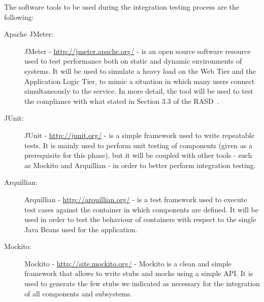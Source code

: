 The software tools to be used during the integration testing process are the following:

\begin{description}
\item[Apache JMeter:] JMeter - \url{http://jmeter.apache.org/} - is an open source software resource used to test performance both on static and dynamic environments of systems. It will be used to simulate a heavy load on the Web Tier and the Application Logic Tier, to mimic a situation in which many users connect simultaneously to the service. In more detail, the tool will be used to test the compliance with what stated in Section 3.3 of the RASD~\cite{rasd}.
\item[JUnit:] JUnit - \url{http://junit.org/} - is a simple framework used to write repeatable tests. It is mainly used to perform unit testing of components (given as a prerequisite for this phase), but it will be coupled with other tools - such as Mockito and Arquillian - in order to better perform integration testing.
\item[Arquillian:] Arquillian - \url{http://arquillian.org/} - is a test framework used to execute test cases against the container in which components are defined. It will be used in order to test the behaviour of containers with respect to the single Java Beans used for the application.
\item[Mockito:] Mockito - \url{http://site.mockito.org/} - Mockito is a clean and simple framework that allows to write stubs and mocks using a simple API. It is used to generate the few stubs we indicated as necessary for the integration of all components and subsystems.
\end{description}